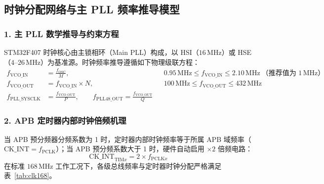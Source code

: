 \documentclass[11pt,a4paper]{ctexart}
\begin{document}
\subsection{时钟分配网络与主 PLL 频率推导模型}

\subsubsection*{1. 主 PLL 数学推导与约束方程}
STM32F407 时钟核心由主锁相环（Main PLL）构成，以 HSI（$16\,\mathrm{MHz}$）或 HSE（$4$--$26\,\mathrm{MHz}$）为基准源。时钟频率推导遵循如下物理级联方程：
\begin{align}
f_{\mathrm{VCO\_IN}} &= \frac{f_{\mathrm{OSC}}}{M},
  && 0.95\,\mathrm{MHz} \le f_{\mathrm{VCO\_IN}} \le 2.10\,\mathrm{MHz}\ \text{（推荐值为 } 1\,\mathrm{MHz}\text{）} \\
f_{\mathrm{VCO\_OUT}} &= f_{\mathrm{VCO\_IN}} \times N,
  && 100\,\mathrm{MHz} \le f_{\mathrm{VCO\_OUT}} \le 432\,\mathrm{MHz} \\
f_{\mathrm{PLL\_SYSCLK}} &= \frac{f_{\mathrm{VCO\_OUT}}}{P},
  \qquad f_{\mathrm{PLL48\_OUT}} = \frac{f_{\mathrm{VCO\_OUT}}}{Q} \nonumber
\end{align}

\subsubsection*{2. APB 定时器内部时钟倍频机理}
当 APB 预分频器分频系数为 1 时，定时器内部时钟频率等于所属 APB 域频率（$\mathrm{CK\_INT}=f_{\mathrm{PCLK}}$）；当 APB 预分频系数大于 1 时，硬件自动启用 $\times 2$ 倍频电路：
\begin{equation}
\mathrm{CK\_INT}_{\mathrm{TIM}x} = 2 \times f_{\mathrm{PCLK}x}
\end{equation}
在标准 $168\,\mathrm{MHz}$ 工作工况下，各级总线频率与定时器时钟分配严格满足表~\ref{tab:clk168}。
\end{document}
